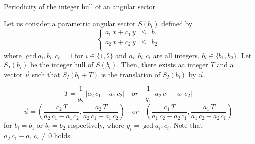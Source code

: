 \begin{frame}{Periodicity of the integer hull of an angular sector}
\begin{theorem}
	\label{th:angle_period}
	Let us consider a parametric angular sector $S(b_i)$ defined by
	\begin{equation*}
		\left\{   \begin{array}{crl}
			a_1\,x + c_1\,y &\le& b_1  \\
			a_2\,x + c_2\,y &\le& b_2  \\
		\end{array}
		\right.
	\end{equation*}
	where $\gcd{a_i,b_i,c_i} = 1$ for $i \in \{ 1, 2\}$ and $a_i, b_i,c_i$ are all integers, $b_i \in \{b_1,b_2\}$.
	Let $S_I(b_i)$ be the integer hull of $S(b_i)$. Then, there exists an integer $T$ and a vector $\vec{u}$  such that $S_I(b_i + T)$ is the translation of $S_I(b_i)$ by $\vec{u}$. 
	
	\[T = \frac{1}{g_2}\,\lvert a_2\,c_1 - a_1\,c_2 \rvert\quad or\quad \frac{1}{g_1}\,\lvert a_2\,c_1 - a_1\,c_2 \rvert\]
	 \[\vec{u} = (\frac{c_2\,T}{a_2\,c_1 - a_1\,c_2}, \frac{a_2\,T}{a_2\,c_1 - a_1\,c_2}) \quad or\quad   (\frac{c_1\,T}{a_1\,c_2 - a_2\,c_1}, \frac{a_1\,T}{a_1\,c_2 - a_2\,c_1})\]
	  for $b_i = b_1$ or $b_i = b_2$ respectively, where $g_i = \gcd{a_i,c_i}$. Note that $a_2\,c_1 - a_1\,c_2 \neq 0$ holds.
\end{theorem}
\end{frame}


